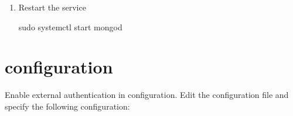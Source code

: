 \documentclass[letterpaper,10pt,english]{sphinxmanual}
\begin{document}
\begin{enumerate}
\begin{quote}
\begin{sphinxadmonition}{note}{On Debian and Ubuntu}
\sphinxAtStartPar
If you have a different path to the keytab file, specify it accordingly.
\end{sphinxadmonition}

\begin{sphinxadmonition}{note}{On RHEL and derivatives}

\sphinxAtStartPar
Edit the environment file at the path  and specify the  variable:

\begin{sphinxVerbatim}[commandchars=\\\{\}]
KRB5\PYGZus{}KTNAME=/etc/mongodb.keytab
\end{sphinxVerbatim}

\sphinxAtStartPar
If you have a different path to the keytab file, specify it accordingly.
\end{sphinxadmonition}
\end{quote}

\item {} 
\sphinxAtStartPar
Restart the  service

\begin{sphinxVerbatim}[commandchars=\\\{\}]
\PYGZdl{} sudo systemctl start mongod
\end{sphinxVerbatim}

\end{enumerate}


\section{ configuration}
\label{\detokenize{kerberos:psmdb-configuration}}
\sphinxAtStartPar
Enable external authentication in  configuration. Edit the  configuration file and specify the following configuration:

\begin{sphinxVerbatim}[commandchars=\\\{\}]

\end{sphinxVerbatim}
\end{document}

